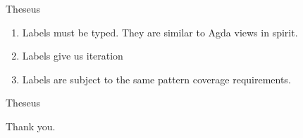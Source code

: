 \documentclass[svgnames,11pt]{beamer}
\begin{document}
\begin{frame}[fragile]{Theseus}


\vfill
\pause

  \begin{enumerate}
  \item Labels must be typed. They are similar to Agda views in spirit. 
  \item Labels give us iteration 
  \item Labels are subject to the same pattern coverage requirements. 
  \end{enumerate}

\pause

\end{frame}




\begin{frame}[fragile]{Theseus}



\end{frame}







\begin{frame}

  \begin{center}
    Thank you.
  \end{center}


\end{frame}
\end{document}
